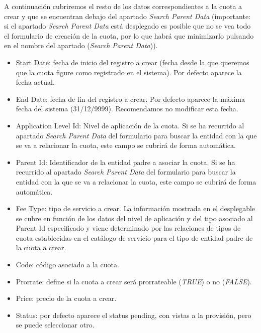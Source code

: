 \begin{description}
A continuación cubriremos el resto de los datos correspondientes a la cuota a crear y que se encuentran debajo del apartado \emph{Search Parent Data} (importante: si el apartado \emph{Search Parent Data} está desplegado es posible que no se vea todo el formulario de creación de la cuota, por lo que habrá que minimizarlo pulsando en el nombre del apartado (\emph{Search Parent Data})).
\begin{itemize}
	\item Start Date: fecha de inicio del registro a crear (fecha desde la que queremos que la cuota figure como registrado en el sistema). Por defecto aparece la fecha actual.
	\item End Date: fecha de fin del registro a crear. Por defecto aparece la máxima fecha del sistema (31/12/9999). Recomendamos no modificar esta fecha.
	\item Application Level Id: Nivel de aplicación de la cuota. Si se ha recurrido al apartado \emph{Search Parent Data} del formulario para buscar la entidad con la que se va a relacionar la cuota, este campo se cubrirá de forma automática. 
	\item Parent Id: Identificador de la entidad padre a asociar la cuota. Si se ha recurrido al apartado \emph{Search Parent Data} del formulario para buscar la entidad con la que se va a relacionar la cuota, este campo se cubrirá de forma automática. 
	\item Fee Type: tipo de servicio a crear. La información mostrada en el desplegable se cubre en función de los datos del nivel de aplicación y del tipo asociado al Parent Id especificado y viene determinado por las relaciones de tipos de cuota establecidas en el catálogo de servicio para el tipo de entidad padre de la cuota a crear.
	\item Code: código asociado a la cuota.
	\item Prorrate: define si la cuota a crear será prorrateable (\textit{TRUE}) o no (\textit{FALSE}).
	\item Price: precio de la cuota a crear.
	\item Status: por defecto aparece el status pending, con vistas a la provisión, pero se puede seleccionar otro.
\end{itemize}




\end{description}
